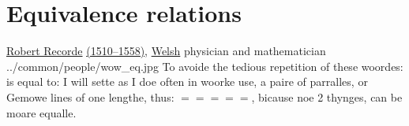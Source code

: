 


\section{Equivalence relations}
%
\qboxnps
  {\href{http://en.wikipedia.org/wiki/Robert_Recorde}{Robert Recorde}
   \href{http://www-history.mcs.st-andrews.ac.uk/Timelines/TimelineC.html}{(1510--1558)},
   \href{http://www-history.mcs.st-andrews.ac.uk/BirthplaceMaps/Places/UK.html}{Welsh} 
   physician and mathematician
   \footnotemark
  }
  {../common/people/wow_eq.jpg}
  {To avoide the tedious repetition of these woordes: is equal to:
   I will sette as I doe often in woorke use, a paire of parralles,
   or Gemowe lines of one lengthe, thus: $=\!=\!=\!=\!=$,
   bicause noe 2 thynges, can be moare equalle.}



